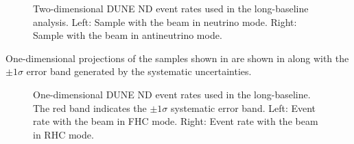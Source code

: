 \begin{figure}[h]
	\begin{minipage}[t]{.5\linewidth}
		\begin{adjustbox}{max totalsize=\linewidth, center}
			
		\end{adjustbox}
	\end{minipage}
	\hfill
	\begin{minipage}[t]{.5\linewidth}
		\begin{adjustbox}{max totalsize=\linewidth, center}
			
		\end{adjustbox}
	\end{minipage}
	\caption[Two-dimensional DUNE ND event rates used in the long-baseline analysis]{Two-dimensional DUNE ND event rates used in the long-baseline analysis. Left: Sample with the beam in neutrino mode. Right: Sample with the beam in antineutrino mode.}
	\label{fig:ndEventRates}
\end{figure}

One-dimensional projections of the samples shown in  are shown in  along with the $\pm1\sigma$ error band generated by the systematic uncertainties.
\begin{figure}
	\begin{minipage}[t]{.5\linewidth}
		\begin{adjustbox}{max totalsize=\linewidth, center}
				
		\end{adjustbox}
	\end{minipage}
	\hfill
	\begin{minipage}[t]{.5\linewidth}
		\begin{adjustbox}{max totalsize=\linewidth, center}
				
		\end{adjustbox}
	\end{minipage}
	\caption[One-dimensional DUNE ND event rates used in the long-baseline analysis with $\pm1\sigma$ systematic error band. The full MC statistics are used for these plots (with a scaling factor) with no fluctuations so the statistical uncertainty is not shown.]{One-dimensional DUNE ND event rates used in the long-baseline. The red band indicates the $\pm1\sigma$ systematic error band. Left: Event rate with the beam in FHC mode. Right: Event rate with the beam in RHC mode.}
	\label{fig:ndEventRatesWithError}
\end{figure}


